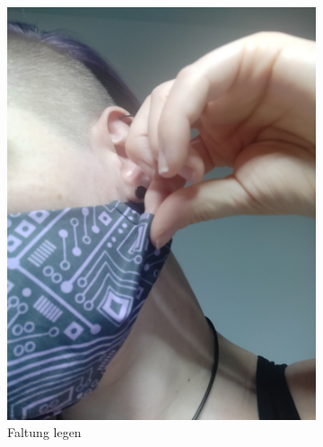 \documentclass[12pt,parskip=full]{scrartcl}
\begin{document}
\begin{figure}[ht]
\begin{subfigure}{0.48\textwidth}
        \includegraphics[width = \linewidth]{Pictures/11_Folding/Folding2.jpg}
        \caption{Faltung legen}
        \label{Folding2}
    \end{subfigure}
    \begin{subfigure}{0.48\textwidth}
        \centering

\end{subfigure}
\end{figure}
\end{document}
